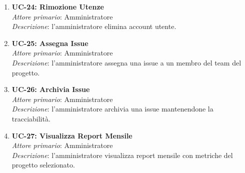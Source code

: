 \begin{enumerate}[leftmargin=1.1em]
\item \textbf{UC-24: Rimozione Utenze} \\
\textit{Attore primario}: Amministratore \\
\textit{Descrizione}: l'amministratore elimina account utente.

\item \textbf{UC-25: Assegna Issue} \\
\textit{Attore primario}: Amministratore \\
\textit{Descrizione}: l'amministratore assegna una issue a un membro del team del progetto.

\item \textbf{UC-26: Archivia Issue} \\
\textit{Attore primario}: Amministratore \\
\textit{Descrizione}: l'amministratore archivia una issue mantenendone la tracciabilità.

\item \textbf{UC-27: Visualizza Report Mensile} \\
\textit{Attore primario}: Amministratore \\
\textit{Descrizione}: l'amministratore visualizza report mensile con metriche del progetto selezionato.

\end{enumerate}

\newpage